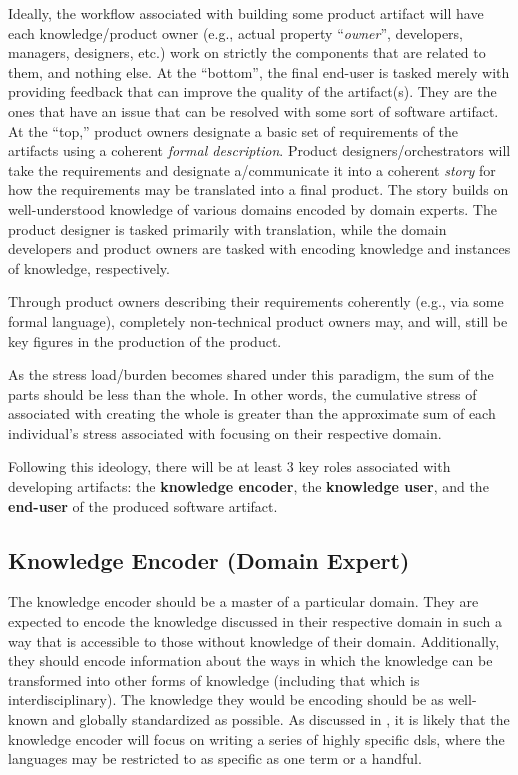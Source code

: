 Ideally, the workflow associated with building some product artifact will have
each knowledge/product owner (e.g., actual property ``\textit{owner}'',
developers, managers, designers, etc.) work on strictly the components that are
related to them, and nothing else. At the ``bottom'', the final end-user is
tasked merely with providing feedback that can improve the quality of the
artifact(s). They are the ones that have an issue that can be resolved with some
sort of software artifact. At the ``top,'' product owners designate a basic set
of requirements of the artifacts using a coherent \textit{formal description}.
Product designers/orchestrators will take the requirements and designate
a/communicate it into a coherent \textit{story} for how the requirements may be
translated into a final product. The story builds on well-understood knowledge
of various domains encoded by domain experts. The product designer is tasked
primarily with translation, while the domain developers and product owners are
tasked with encoding knowledge and instances of knowledge, respectively.

Through product owners describing their requirements coherently (e.g., via some
formal language), completely non-technical product owners may, and will, still
be key figures in the production of the product.

As the stress load/burden becomes shared under this paradigm, the sum of the
parts should be less than the whole. In other words, the cumulative stress of
associated with creating the whole is greater than the approximate sum of each
individual's stress associated with focusing on their respective domain.

Following this ideology, there will be at least 3 key roles associated with
developing artifacts: the \textbf{knowledge encoder}, the \textbf{knowledge
user}, and the \textbf{end-user} of the produced software artifact.

\subsection{Knowledge Encoder (Domain Expert)}
\label{chap:ideology:sec:a_prospective_workflow:subsec:knowledge_encoder}

The knowledge encoder should be a master of a particular domain. They are
expected to encode the knowledge discussed in their respective domain in such a
way that is accessible to those without knowledge of their domain. Additionally,
they should encode information about the ways in which the knowledge can be
transformed into other forms of knowledge (including that which is
interdisciplinary). The knowledge they would be encoding should be as well-known
and globally standardized as possible. As discussed in
, it is
likely that the knowledge encoder will focus on writing a series of highly
specific \aclp{dsl}, where the languages may be restricted to as specific as one
term or a handful.


